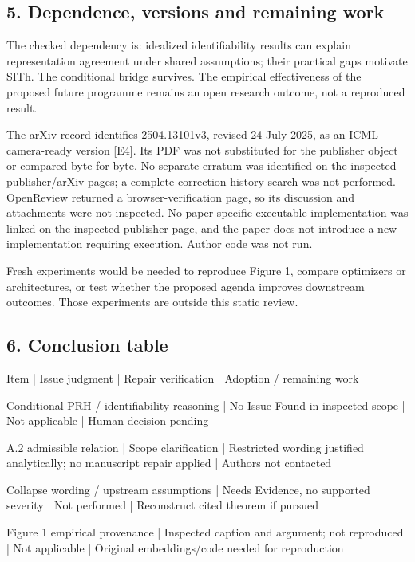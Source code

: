 \documentclass[10pt]{article}
\begin{document}
\subsection*{5. Dependence, versions and remaining work}
The checked dependency is: idealized identifiability results can explain representation agreement under shared assumptions; their practical gaps motivate SITh. The conditional bridge survives. The empirical effectiveness of the proposed future programme remains an open research outcome, not a reproduced result.\par
The arXiv record identifies 2504.13101v3, revised 24 July 2025, as an ICML camera-ready version [E4]. Its PDF was not substituted for the publisher object or compared byte for byte. No separate erratum was identified on the inspected publisher/arXiv pages; a complete correction-history search was not performed. OpenReview returned a browser-verification page, so its discussion and attachments were not inspected. No paper-specific executable implementation was linked on the inspected publisher page, and the paper does not introduce a new implementation requiring execution. Author code was not run.\par
Fresh experiments would be needed to reproduce Figure 1, compare optimizers or architectures, or test whether the proposed agenda improves downstream outcomes. Those experiments are outside this static review.\par
\subsection*{6. Conclusion table}
Item | Issue judgment | Repair verification | Adoption / remaining work\par
Conditional PRH / identifiability reasoning | No Issue Found in inspected scope | Not applicable | Human decision pending\par
A.2 admissible relation | Scope clarification | Restricted wording justified analytically; no manuscript repair applied | Authors not contacted\par
Collapse wording / upstream assumptions | Needs Evidence, no supported severity | Not performed | Reconstruct cited theorem if pursued\par
Figure 1 empirical provenance | Inspected caption and argument; not reproduced | Not applicable | Original embeddings/code needed for reproduction\par
\end{document}
